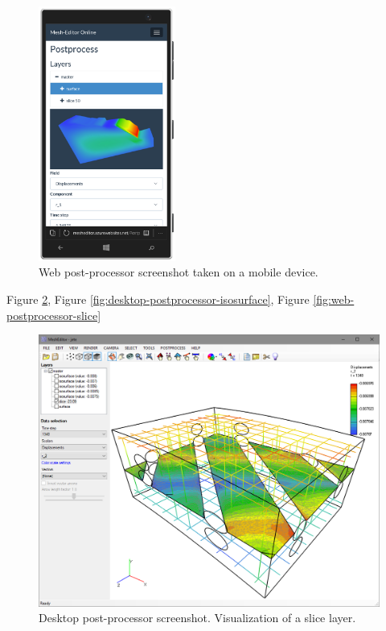\begin{figure}[H]
    \centering
    \includegraphics[width=0.4\textwidth]{figures/chapter-data-management/web-postprocessor-mobile}
    \decoRule
    \caption{Web post-processor screenshot taken on a mobile device.}
    \label{fig:web-postprocessor-mobile}
\end{figure}


Figure \ref{fig:desktop-postprocessor-slice},
Figure \ref{fig:desktop-postprocessor-isosurface},
Figure \ref{fig:web-postprocessor-slice}

\begin{figure}[H]
    \centering
    \includegraphics[width=\textwidth]{figures/chapter-data-management/desktop-postprocessor-slice}
    \decoRule
    \caption{Desktop post-processor screenshot. Visualization of a slice layer.}
    \label{fig:desktop-postprocessor-slice}
\end{figure}


